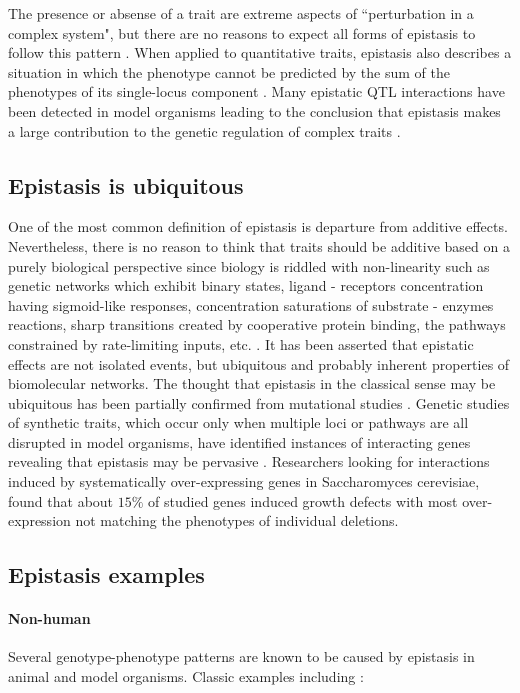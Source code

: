 The presence or absense of a trait are extreme aspects of ``perturbation in a complex system", but there are no reasons to expect all forms of epistasis to follow this pattern \cite{phillips2008epistasis}.
When applied to quantitative traits, epistasis also describes a situation in which the phenotype cannot be predicted by the sum of the phenotypes of its single-locus component \cite{carlborg2004epistasis}.
Many epistatic QTL interactions have been detected in model organisms leading to the conclusion that epistasis makes a large contribution to the genetic regulation of complex traits  \cite{carlborg2004epistasis}.

\subsection{Epistasis is ubiquitous}

One of the most common definition of epistasis is departure from additive effects.
Nevertheless, there is no reason to think that traits should be additive based on a purely biological perspective \cite{zuk2012mystery} since biology is riddled with non-linearity such as genetic networks which exhibit binary states, ligand - receptors concentration having sigmoid-like responses, concentration saturations of substrate - enzymes reactions, sharp transitions created by cooperative protein binding, the pathways constrained by rate-limiting inputs, etc. \cite{zuk2012mystery}. 
It has been asserted that epistatic effects are not isolated events, but ubiquitous \cite{tyler2009shadows} and probably inherent properties of biomolecular networks.
The thought that epistasis in the classical sense may be ubiquitous has been partially confirmed from mutational studies \cite{phillips2008epistasis}.
Genetic studies of synthetic traits, which occur only when multiple loci or pathways are all disrupted in model organisms, have identified instances of interacting genes revealing that epistasis may be pervasive \cite{zuk2012mystery}. 
Researchers \cite{phillips2008epistasis} looking for interactions induced by systematically over-expressing genes in Saccharomyces cerevisiae, found that about $15\%$ of studied genes induced growth defects with most over-expression not matching the phenotypes of individual deletions.  

\subsection{Epistasis examples}

\paragraph{Non-human}
Several genotype-phenotype patterns are known to be caused by epistasis in animal and model organisms. 
Classic examples including \cite{carlborg2004epistasis}:

